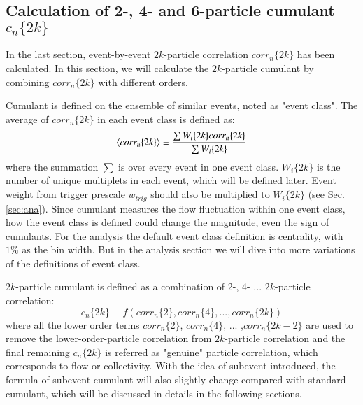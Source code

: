 \subsection{Calculation of 2-, 4- and 6-particle cumulant $c_n\{2k\}$}
In the last section, event-by-event $2k$-particle correlation $corr_n\{2k\}$ has been calculated. In this section, we will calculate the $2k$-particle cumulant by combining $corr_n\{2k\}$ with different orders.

Cumulant is defined on the ensemble of similar events, noted as "event class". The average of $corr_n\{2k\}$ in each event class is defined as:
\begin{equation}
\left\langle corr_n\{2k\}\right\rangle\equiv\frac{\sum W_i\{2k\}corr_n\{2k\}}{\sum W_i\{2k\}}
\end{equation}
where the summation $\sum$ is over every event in one event class. $W_i\{2k\}$ is the number of unique multiplets in each event, which will be defined later. Event weight from trigger prescale $w_{trig}$ should also be multiplied to $W_{i}\{2k\}$ (see Sec.\ref{sec:ana}). Since cumulant measures the flow fluctuation within one event class, how the event class is defined could change the magnitude, even the sign of cumulants. For the analysis the default event class definition is centrality, with $1\%$ as the bin width. But in the analysis section we will dive into more variations of the definitions of event class.

$2k$-particle cumulant is defined as a combination of 2-, 4- ... $2k$-particle correlation:
\begin{equation}
c_n\{2k\}\equiv f(corr_n\{2\},corr_n\{4\}, ... ,corr_n\{2k\})
\end{equation}
where all the lower order terms $corr_n\{2\}$, $corr_n\{4\}$, ... ,$corr_n\{2k-2\}$ are used to remove the lower-order-particle correlation from $2k$-particle correlation and the final remaining $c_n\{2k\}$ is referred as "genuine" particle correlation, which corresponds to flow or collectivity. With the idea of subevent introduced, the formula of subevent cumulant will also slightly change compared with standard cumulant, which will be discussed in details in the following sections.



